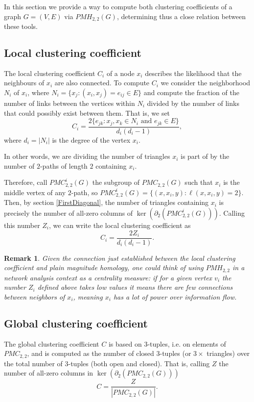 \documentclass{article}
\newtheorem{remark}[theorem]{Remark}
\begin{document}
	In this section we provide a way to compute both clustering coefficients of a graph $G=(V,E)$ via $PMH_{2,2}(G)$, determining thus a close relation between these tools.
	
	
	\subsection{Local clustering coefficient}
	
	The local clustering coefficient $C_i$ of a node $x_i$ describes the likelihood that the neighbours of $x_i$ are also connected.
	To compute $C_i$ we consider the neighborhood $N_i$ of $x_i$, where $N_i=\{x_j:(x_i,x_j)=e_{ij}\in E\}$ and compute the fraction of the number of links between the vertices within $N_i$ divided by the number of links that could possibly exist between them.
	That is, we set
	\[
	C_i = \frac{2\{e_{jk}:x_j,x_k \in N_i \text{ and } e_{jk}\in E\}}{d_i(d_i -1)},
	\]
	where $d_i=|N_i|$ is the degree of the vertex $x_i$.
	
	In other words, we are dividing the number of triangles $x_i$ is part of by the number of $2$-paths of length $2$ containing $x_i$.
	
	Therefore, call $PMC_{2,2}^i(G)$ the subgroup of $PMC_{2,2}(G)$ such that $x_i$ is the middle vertex of any $2$-path, so $PMC_{2,2}^i(G)=\{(x,x_i,y): \ell(x,x_i,y)=2\}$.
	Then, by section \ref{FirstDiagonal}, the number of triangles containing $x_i$ is precisely the number of all-zero columns of $\ker(\partial_2(PMC_{2,2}^i(G)))$.
	Calling this number $Z_i$, we can write the local clustering coefficient as
	\[
	C_i = \frac{2 Z_i}{d_i(d_i -1)}.
	\]
	
	\begin{remark}
		Given the connection just established between the local clustering coefficient and plain magnitude homology, one could think of using $PMH_{2,2}$ in a network analysis context as a \emph{centrality measure}: if for a given vertex $v_i$ the number $Z_i$ defined above takes low values it means there are few connections between neighbors of $x_i$, meaning $x_i$ has a lot of power over information flow. 
	\end{remark}
	
	
	\subsection{Global clustering coefficient}
	
	The global clustering coefficient $C$ is based on $3$-tuples, i.e. on elements of $PMC_{2,2}$, and is computed as the number of closed $3$-tuples (or $3  \times$ triangles) over the total number of $3$-tuples (both open and closed).
	That is, calling $Z$ the number of all-zero columns in $\ker(\partial_2(PMC_{2,2}(G)))$
	\[
	C = \frac{Z}{|PMC_{2,2}(G)|}.
	\]
	
\end{document}
